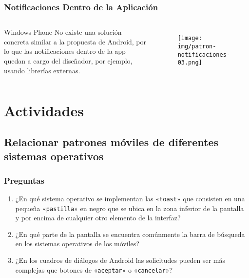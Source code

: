 \documentclass{beamer}
\begin{document}
\begin{frame}
\frametitle{Notificaciones Dentro de la Aplicación}

\begin{columns}[c] %

\begin{block}{Windows Phone}
\justify
No existe una solución concreta similar a la propuesta de Android, por lo que las notificaciones dentro de la app quedan a cargo del diseñador, por ejemplo, usando librerías externas.
\end{block}

\begin{figure}[H]
  \centering
  \texttt{[image: img/patron-notificaciones-03.png]}
\end{figure}
\end{columns}
\end{frame}

\section{Actividades}
\subsection{Relacionar patrones móviles de diferentes sistemas operativos}

\begin{frame}
\frametitle{Preguntas}

\begin{enumerate}
    \item ¿En qué sistema operativo se implementan las «\texttt{toast}» que consisten en una pequeña «\texttt{pastilla}» en negro que se ubica en la zona inferior de la pantalla y por encima de cualquier otro elemento de la interfaz? \vspace{0.5cm}
    \item ¿En qué parte de la pantalla se encuentra comúnmente la barra de búsqueda en los sistemas operativos de los móviles? \vspace{0.5cm}
    \item ¿En los cuadros de diálogos de Android las solicitudes pueden ser más complejas que botones de «\texttt{aceptar}» o «\texttt{cancelar}»?
\end{enumerate}
\end{frame}
\end{document}
